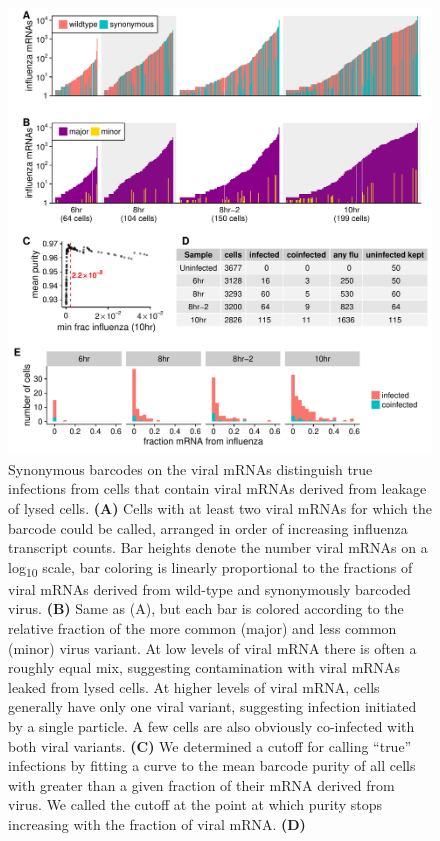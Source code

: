 \documentclass[9pt,lineno]{elife}
\begin{document}
\begin{figure}[t!]
\centerline{\includegraphics[width=0.9\linewidth]{figures/p_frac_flu_summary.pdf}}
\caption{\label{fig:viralbarcodes}
Synonymous barcodes on the viral mRNAs distinguish true infections from cells that contain viral mRNAs derived from leakage of lysed cells.
{\bf (A)}
Cells with at least two viral mRNAs for which the barcode could be called, arranged in order of increasing influenza transcript counts.
Bar heights denote the number viral mRNAs on a log\textsubscript{10} scale, bar coloring is linearly proportional to the fractions of viral mRNAs derived from wild-type and synonymously barcoded virus.
{\bf (B)}
Same as (A), but each bar is colored according to the relative fraction of the more common (major) and less common (minor) virus variant.
At low levels of viral mRNA there is often a roughly equal mix, suggesting contamination with viral mRNAs leaked from lysed cells.
At higher levels of viral mRNA, cells generally have only one viral variant, suggesting infection initiated by a single particle.
A few cells are also obviously co-infected with both viral variants.
{\bf (C)}
We determined a cutoff for calling ``true'' infections by fitting a curve to the mean barcode purity of all cells with greater than a given fraction of their mRNA derived from virus.
We called the cutoff at the point at which purity stops increasing with the fraction of viral mRNA.
{\bf (D)}
}
\end{figure}
\end{document}
